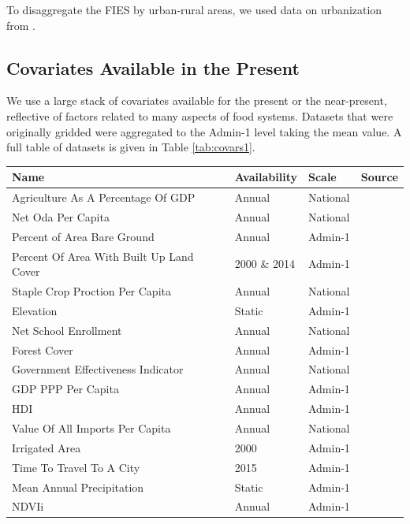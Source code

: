\documentclass{article}
\begin{document}
To disaggregate the FIES by urban-rural areas, we used data on urbanization from \cite{Jiang2017}.

\subsection{Covariates Available in the Present}
We use a large stack of covariates available for the present or the near-present, reflective of factors related to many aspects of food systems.  Datasets that were originally gridded were aggregated to the Admin-1 level taking the mean value.  A full table of datasets is given in Table \ref{tab:covars1}.

\begin{table}[H]
	\begin{tabular}{llll}
		\toprule
		Name & Availability & Scale & Source \\
		\midrule
		Agriculture As A Percentage Of GDP & Annual & National & \cite{TheWorldBank2016} \\
		Net Oda Per Capita & Annual & National & \cite{TheWorldBank2016} \\
		Percent of Area Bare Ground & Annual & Admin-1 & \cite{Song2018} \\
		Percent Of Area With Built Up Land Cover & 2000 \& 2014 & Admin-1 & \cite{Pesaresi2015} \\
		Staple Crop Proction Per Capita & Annual & National & \cite{FAOSTAT2018} \\
		Elevation & Static & Admin-1 & \cite{USGS1996} \\
		Net School Enrollment & Annual & National & \cite{TheWorldBank2016} \\
		Forest Cover & Annual & Admin-1 & \cite{Song2018} \\
		Government Effectiveness Indicator & Annual & National & \cite{Kaufmann2011} \\
		GDP PPP Per Capita & Annual & Admin-1 & \cite{Kummu2018} \\
		HDI & Annual & Admin-1 & \cite{Kummu2018} \\
		Value Of All Imports Per Capita & Annual & National & \cite{TheWorldBank2016} \\
		Irrigated Area & 2000 & Admin-1 & \cite{SiebertS.DollP.FeickS.FrenkenK.Hoogeveen2013} \\
		Time To Travel To A City  & 2015 & Admin-1 & \cite{Uchida2008} \\
		Mean Annual Precipitation & Static & Admin-1 & \cite{Funk2015} \\
		NDVIi & Annual & Admin-1 & \cite{Song2018} \\

\end{tabular}
\end{table}
\end{document}
